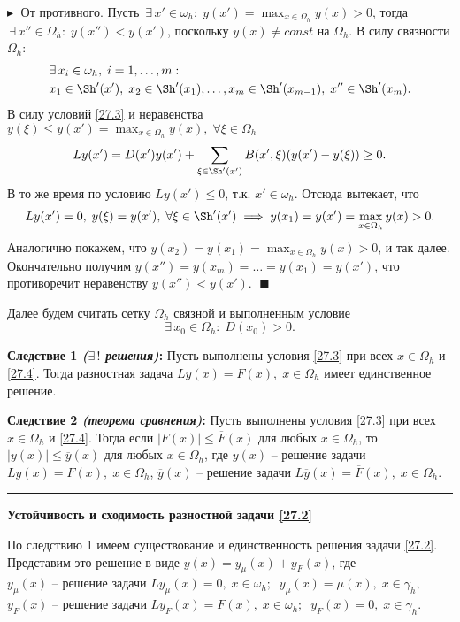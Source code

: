 $\blacktriangleright\;$ От противного. Пусть $\,\exists  \, x'\in \omega_h: \; y(x') = \max_{x\in\Omega_h} y(x) > 0$, тогда $\,\exists\, x''\in\Omega_h:\; y(x'') < y(x')$, поскольку $y(x) \ne const$ на $\Omega_h$. В силу связности $\Omega_h$:
\begin{align*}
    &\exists \, x_i \in \omega_h, \; i = 1, \ldots, m:\\
    & x_1 \in \Sh'(x'), \; x_2 \in \Sh'(x_1), \ldots, x_m \in \Sh'(x_{m-1}), \; x'' \in \Sh'(x_m).
\end{align*}
В силу условий \eqref{27.3} и неравенства $y(\xi) \leq y(x') = \max_{x\in\Omega_h} y(x), \; \forall \xi \in \Omega_h$
$$
L y(x') = D(x') y(x') +  \sum_{\xi \in \Sh'(x')} B(x', \xi) (y(x') - y(\xi)) \geq 0.
$$
В то же время по условию $Ly(x') \leq 0$, т.к. $x' \in \omega_h$. Отсюда вытекает, что
$$
L y(x') = 0, \; y(\xi) = y(x'), \;\forall \xi \in \Sh'(x') \implies y(x_1) = y(x') = \max_{x\in\Omega_h} y(x) > 0.
$$
Аналогично покажем, что $y(x_2) = y(x_1) = \max_{x\in\Omega_h} y(x) > 0$, и так далее. Окончательно получим $y(x'') = y(x_m) = \ldots =y(x_1) = y(x')$, что противоречит неравенству $y(x'') < y(x')$. $\;\blacksquare$

Далее будем считать сетку $\Omega_h$ связной и выполненным условие
\begin{equation}
    \label{27.4}
    \exists\, x_0 \in \Omega_h:\; D(x_0) > 0.
\end{equation}

\textbf{Следствие 1 \textit{($\exists\,!$ решения)}:}\; Пусть выполнены условия \eqref{27.3} при всех $x \in \Omega_h$ и \eqref{27.4}. Тогда разностная задача $L y(x) = F(x), \; x\in \Omega_h$ имеет единственное решение.

\textbf{Следствие 2 \textit{(теорема сравнения)}:}\; Пусть выполнены условия \eqref{27.3} при всех $x \in \Omega_h$ и \eqref{27.4}. Тогда если $|F(x)| \leq \overline{F}(x)$ для любых $x \in \Omega_h$, то $|y(x)| \leq \overline{y}(x)$ для любых $x \in \Omega_h$, где $y(x)$ -- решение задачи $L y(x) = F(x), \; x\in \Omega_h$, $\overline{y}(x)$ -- решение задачи $L\overline{y}(x) = \overline{F}(x),\; x\in\Omega_h$.

\rule{275pt}{0.5pt}

\textbf{Устойчивость и сходимость разностной задачи \eqref{27.2}}

По следствию 1 имеем существование и единственность решения задачи \eqref{27.2}. Представим это решение в виде $y(x) = y_\mu(x) + y_F(x)$, где
\\$y_\mu(x)$ -- решение задачи $L y_\mu(x) = 0, \;x \in \omega_h; \;\; y_\mu(x) = \mu(x),\;x\in\gamma_h$,
\\$y_F(x)$ -- решение задачи $L y_F(x) = F(x), \; x\in \omega_h;\;\;y_F(x) = 0, \; x\in\gamma_h$.

